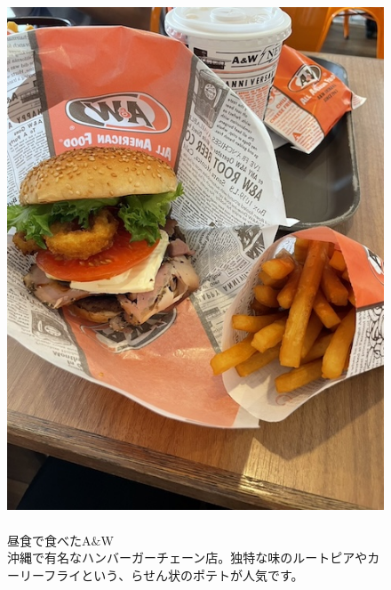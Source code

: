 \documentclass[../main]{subfiles}
\begin{document}
\begin{figure}[H]
  \begin{minipage}[b]{0.48\columnwidth}
    \caption{\\
    昼食で食べたA$\&$W\\
    沖縄で有名なハンバーガーチェーン店。独特な味のルートピアやカーリーフライという、らせん状のポテトが人気です。
    }
  \end{minipage}
  \hspace{0.04\columnwidth} %
  \begin{minipage}[b]{0.48\columnwidth}
    \centering
    \includegraphics[width=0.7\columnwidth]{figure/aandw.jpg}
  \end{minipage}
\end{figure}
\end{document}
